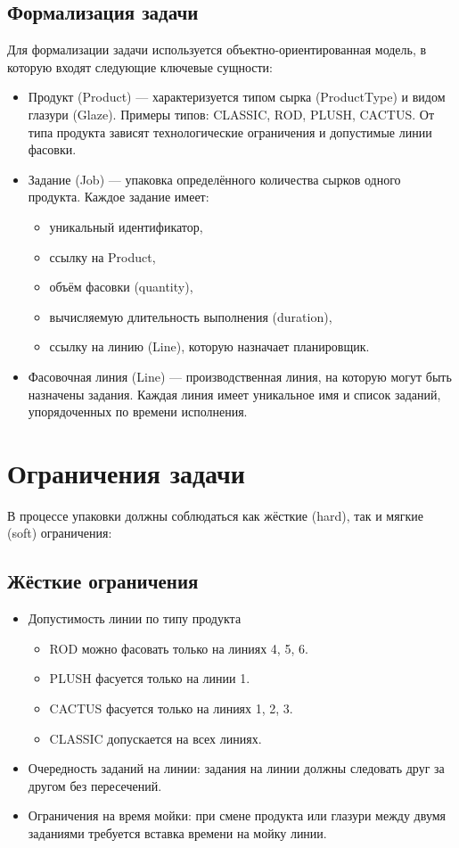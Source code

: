\subsection{Формализация задачи}

Для формализации задачи используется объектно-ориентированная модель, в которую входят следующие ключевые сущности:

\begin{itemize}
    \item Продукт (Product) — характеризуется типом сырка (ProductType) и видом глазури (Glaze). Примеры типов: CLASSIC, ROD, PLUSH, CACTUS. От типа продукта зависят технологические ограничения и допустимые линии фасовки.
    \item Задание (Job) — упаковка определённого количества сырков одного продукта. Каждое задание имеет:
    \begin{itemize}
        \item уникальный идентификатор,
        \item ссылку на Product,
        \item объём фасовки (quantity),
        \item вычисляемую длительность выполнения (duration),
        \item ссылку на линию (Line), которую назначает планировщик.
    \end{itemize}
    \item Фасовочная линия (Line) — производственная линия, на которую могут быть назначены задания. Каждая линия имеет уникальное имя и список заданий, упорядоченных по времени исполнения.
\end{itemize}

\section{Ограничения задачи}

В процессе упаковки должны соблюдаться как жёсткие (hard), так и мягкие (soft) ограничения:

\subsection{ Жёсткие ограничения}

\begin{itemize}
    \item Допустимость линии по типу продукта
    \begin{itemize}
        \item ROD можно фасовать только на линиях 4, 5, 6.
        \item PLUSH фасуется только на линии 1.
        \item CACTUS фасуется только на линиях 1, 2, 3.
        \item CLASSIC допускается на всех линиях.
    \end{itemize}
    \item Очередность заданий на линии: задания на линии должны следовать друг за другом без пересечений.
    \item Ограничения на время мойки: при смене продукта или глазури между двумя заданиями требуется вставка времени на мойку линии.
\end{itemize}


